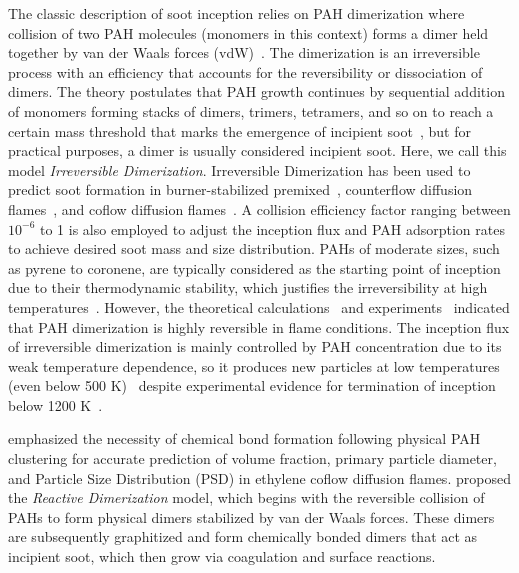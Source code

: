 The classic description of soot inception relies on PAH dimerization where collision of two PAH molecules (monomers in this context) forms a dimer held together by van der Waals forces (vdW)~\citep{frenklach1991detailed}. The dimerization is an irreversible process with an efficiency that accounts for the reversibility or dissociation of dimers. The theory postulates that PAH growth continues by sequential addition of monomers forming stacks of dimers, trimers, tetramers, and so on to reach a certain mass threshold that marks the emergence of incipient soot~\citep{frenklach1991detailed}, but for practical purposes, a dimer is usually considered incipient soot. Here, we call this model \textit{Irreversible Dimerization}. 
Irreversible Dimerization has been used to predict soot formation in burner-stabilized premixed~\citep{salenbauch2015modeling, desgroux2017comparative}, counterflow diffusion flames~\citep{wang2015soot, xu2021experimental}, and coflow diffusion flames~\citep{kholghy2016core, veshkini2016understanding}. A collision efficiency factor ranging between $10^{-6}$ to 1 is also employed to adjust the inception flux and PAH adsorption rates to achieve desired soot mass and size distribution. PAHs of moderate sizes, such as pyrene to coronene, are typically considered as the starting point of inception due to their thermodynamic stability, which justifies the irreversibility at high temperatures~\citep{frenklach1991detailed}. However, the theoretical calculations~\citep{miller1985calculations} and experiments~\citep{sabbah2010exploring} indicated that PAH dimerization is highly reversible in flame conditions. The inception flux of irreversible dimerization is mainly controlled by PAH concentration due to its weak temperature dependence, so it produces new particles at low temperatures (even below 500 K)~\citep{naseri2022simulating} despite experimental evidence for termination of inception below 1200 K~\citep{sanchez2012polycyclic, cho2016synthesis}. 



\citet{kholghy2019role} emphasized the necessity of chemical bond formation following physical PAH clustering for accurate prediction of volume fraction, primary particle diameter, and Particle Size Distribution (PSD) in ethylene coflow diffusion flames. \citet{kholghy2018reactive} proposed the \textit{Reactive Dimerization} model, which begins with the reversible collision of PAHs to form physical dimers stabilized by van der Waals forces. These dimers are subsequently graphitized and form chemically bonded dimers that act as incipient soot, which then grow via coagulation and surface reactions.

